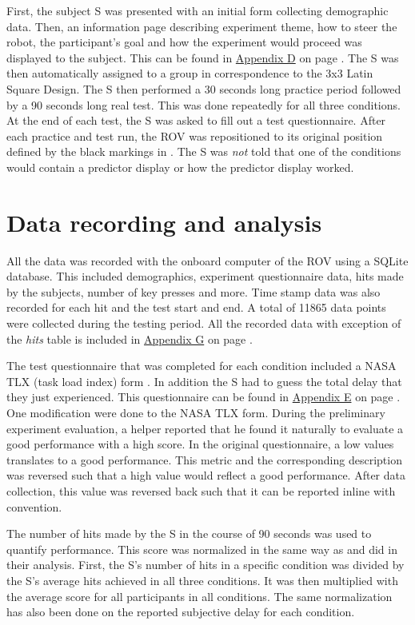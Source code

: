 First, the subject S was presented with an initial form collecting demographic data. Then, an information page describing experiment theme, how to steer the robot, the participant's goal and how the experiment would proceed was displayed to the subject. This can be found in \hyperref[appInfo]{Appendix D} on page \pageref{appInfo}. The S was then automatically assigned to a group in correspondence to the 3x3 Latin Square Design. The S then performed a 30 seconds long practice period followed by a 90 seconds long real test. This was done repeatedly for all three conditions. At the end of each test, the S was asked to fill out a test questionnaire.  After each practice and test run, the ROV was repositioned to its original position defined by the black markings in . The S was \emph{not} told that one of the conditions would contain a predictor display or how the predictor display worked.

\section{Data recording and analysis}

All the data was recorded with the onboard computer of the ROV using a SQLite database. This included demographics, experiment questionnaire data, hits made by the subjects, number of key presses and more. Time stamp data was also recorded for each hit and the test start and end. A total of 11865 data points were collected during the testing period. All the recorded data with exception of the \emph{hits} table is included in \hyperref[appDatabase]{Appendix G} on page \pageref{appDatabase}.

The test questionnaire that was completed for each condition included a NASA TLX (task load index) form \citep{Hart1988}. In addition the S had to guess the total delay that they just experienced. This questionnaire can be found in \hyperref[appSurvey]{Appendix E} on page \pageref{appSurvey}. One modification were done to the NASA TLX form. During the preliminary experiment evaluation, a helper reported that he found it naturally to evaluate a good performance with a high score. In the original questionnaire, a low values translates to a good performance. This metric and the corresponding description was reversed such that a high value would reflect a good performance. After data collection, this value was reversed back such that it can be reported inline with convention.

The number of hits made by the S in the course of 90 seconds was used to quantify performance. This score was normalized in the same way as \citet{Rachmielowski2010} and \citet{Lovi2010} did in their analysis. First, the S's number of hits in a specific condition was divided by the S's average hits achieved in all three conditions. It was then multiplied with the average score for all participants in all conditions. The same normalization has also been done on the reported subjective delay for each condition.

